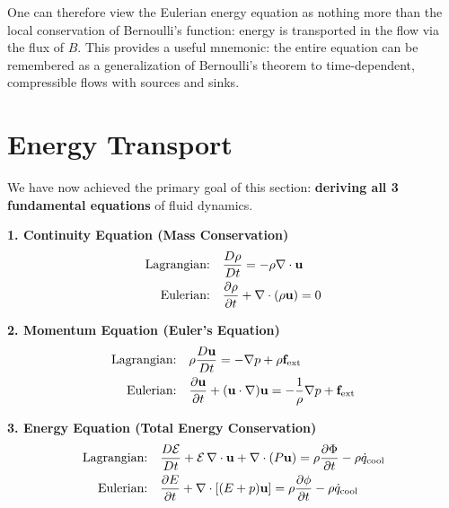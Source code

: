\begin{remark}
One can therefore view the Eulerian energy equation as nothing more than
the local conservation of Bernoulli’s function: energy is transported in
the flow via the flux of $B$. This provides a useful mnemonic: the entire
equation can be remembered as a generalization of Bernoulli’s theorem to
time-dependent, compressible flows with sources and sinks.
\end{remark}

\section{Energy Transport}

We have now achieved the primary goal of this section: \textbf{deriving all 3 fundamental equations} of fluid dynamics.

\begin{tcolorbox}[colback=blue!3!white, colframe=blue!50!black, title={Summary of Ideal Fluid Equations}]
\textbf{1. Continuity Equation (Mass Conservation)}  
\begin{align*}
\text{Lagrangian:} \quad & \frac{D\rho}{Dt} = -\rho \nabla \cdot {\bf u} \\
\text{Eulerian:} \quad & \frac{\partial \rho}{\partial t} + \nabla \cdot (\rho {\bf u}) = 0
\end{align*}

\vspace{0.5em}
\textbf{2. Momentum Equation (Euler's Equation)}  
\begin{align*}
\text{Lagrangian:} \quad & \rho \frac{D{\bf u}}{Dt} = -\nabla p + \rho {\bf f}_{\rm ext} \\
\text{Eulerian:} \quad & \frac{\partial {\bf u}}{\partial t} + ({\bf u} \cdot \nabla) {\bf u} = -\frac{1}{\rho} \nabla p + {\bf f}_{\rm ext}
\end{align*}

\vspace{0.5em}
\textbf{3. Energy Equation (Total Energy Conservation)}  
\begin{align*}
\text{Lagrangian:} \quad & \frac{D\mathcal{E}}{Dt} + \mathcal{E}\,\nabla\cdot{\bf u} 
+ \nabla\cdot(P{\bf u})
= \rho \frac{\partial \Phi}{\partial t} - \rho \dot{q}_{\rm cool} \\
\text{Eulerian:} \quad & \frac{\partial E}{\partial t} + \nabla \cdot \left[(E + p) {\bf u} \right] = \rho \frac{\partial \phi}{\partial t} - \rho \dot{q}_{\rm cool}
\end{align*}
\end{tcolorbox}

